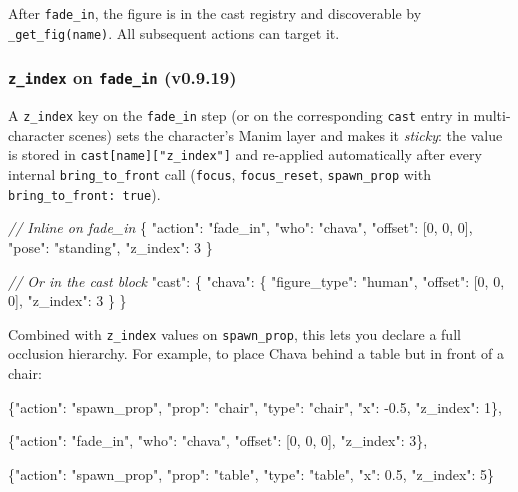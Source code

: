 \documentclass[
  12pt,
  letterpaper,
]{book}
\newenvironment{Shaded}{}{}
\newcommand{\CommentTok}[1]{\textcolor[rgb]{0.38,0.63,0.69}{\textit{#1}}}
\newcommand{\NormalTok}[1]{#1}
\begin{document}
After \texttt{fade\_in}, the figure is in the cast registry and
discoverable by \texttt{\_get\_fig(name)}. All subsequent actions can
target it.

\subsubsection{\texttt{z\_index} on \texttt{fade\_in} (v0.9.19)}\label{fade-in-z-index}

A \texttt{z\_index} key on the \texttt{fade\_in} step (or on the
corresponding \texttt{cast} entry in multi-character scenes) sets the
character's Manim layer and makes it \emph{sticky}: the value is stored
in \texttt{cast[name]["z\_index"]} and re-applied automatically after
every internal \texttt{bring\_to\_front} call (\texttt{focus},
\texttt{focus\_reset}, \texttt{spawn\_prop} with
\texttt{bring\_to\_front:\ true}).

\begin{Shaded}
\begin{Highlighting}[]
\CommentTok{// Inline on fade\_in}
\NormalTok{\{}
\NormalTok{  "action": "fade\_in",}
\NormalTok{  "who": "chava",}
\NormalTok{  "offset": [0, 0, 0],}
\NormalTok{  "pose": "standing",}
\NormalTok{  "z\_index": 3}
\NormalTok{\}}

\CommentTok{// Or in the cast block}
\NormalTok{"cast": \{}
\NormalTok{  "chava": \{}
\NormalTok{    "figure\_type": "human",}
\NormalTok{    "offset": [0, 0, 0],}
\NormalTok{    "z\_index": 3}
\NormalTok{  \}}
\NormalTok{\}}
\end{Highlighting}
\end{Shaded}

Combined with \texttt{z\_index} values on \texttt{spawn\_prop}, this
lets you declare a full occlusion hierarchy. For example, to place Chava
behind a table but in front of a chair:

\begin{Shaded}
\begin{Highlighting}[]
\NormalTok{\{"action": "spawn\_prop", "prop": "chair", "type": "chair",}
\NormalTok{ "x": -0.5, "z\_index": 1\},}

\NormalTok{\{"action": "fade\_in", "who": "chava", "offset": [0, 0, 0], "z\_index": 3\},}

\NormalTok{\{"action": "spawn\_prop", "prop": "table", "type": "table",}
\NormalTok{ "x": 0.5, "z\_index": 5\}}
\end{Highlighting}
\end{Shaded}
\end{document}
